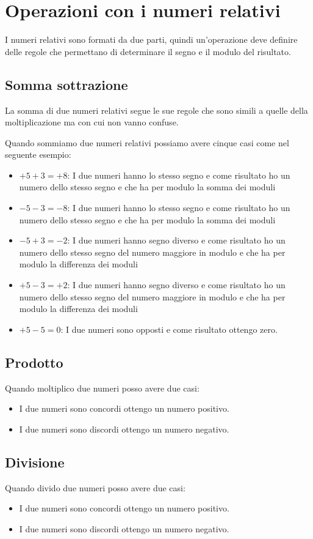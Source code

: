 \section{Operazioni con i numeri relativi}
\label{sec:Operazioniconnumerirelativi}
I numeri relativi sono formati da due parti, quindi un'operazione deve definire delle regole che permettano di determinare il segno e il modulo del risultato.
\subsection{Somma sottrazione}
La somma di due numeri relativi segue le sue regole che sono simili a quelle della moltiplicazione ma con cui non vanno confuse.

Quando sommiamo due numeri relativi possiamo avere cinque casi come nel seguente esempio:
\begin{itemize}
	\item $+5+3=+8$: I due numeri hanno lo stesso segno e come risultato ho un numero dello stesso segno e che ha per modulo la somma dei moduli
	\item $-5-3=-8$: I due numeri hanno lo stesso segno e come risultato ho un numero dello stesso segno e che ha per modulo la somma dei moduli
	\item $-5+3=-2$: I due numeri hanno segno diverso e come risultato ho un numero dello stesso segno del numero maggiore in modulo e che ha per modulo la differenza dei moduli
	\item $+5-3=+2$: I due numeri hanno segno diverso e come risultato ho un numero dello stesso segno del numero maggiore in modulo e che ha per modulo la differenza dei moduli
	\item $+5-5=0$: I due numeri sono opposti e come risultato ottengo zero.
\end{itemize}
\subsection{Prodotto}
Quando moltiplico due numeri posso avere due casi:
\begin{itemize}
	\item I due numeri sono concordi ottengo un numero positivo.
	\item I due numeri sono discordi ottengo un numero negativo.
\end{itemize}
\subsection{Divisione}
Quando divido due numeri posso avere due casi:
\begin{itemize}
	\item I due numeri sono concordi ottengo un numero positivo.
	\item I due numeri sono discordi ottengo un numero negativo.
\end{itemize}
